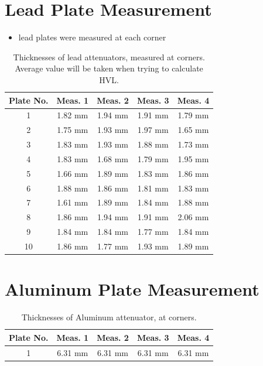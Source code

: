 \documentclass[a4paper]{article}
\begin{document}
\section{Lead Plate Measurement}
\begin{itemize}
    \item lead plates were measured at each corner
\end{itemize}
\begin{table}[H]
    \centering
    \caption{Thicknesses of lead attenuators, measured at corners. Average value will be taken when trying to calculate HVL.}
    \begin{tabular}{c c c c c}
        \toprule
        \textbf{Plate No.} & \textbf{Meas. 1} & \textbf{Meas. 2} & \textbf{Meas. 3} & \textbf{Meas. 4}\\
        \midrule
        1 & 1.82 mm & 1.94 mm & 1.91 mm & 1.79 mm\\
        2 & 1.75 mm & 1.93 mm & 1.97 mm & 1.65 mm\\
        3 & 1.83 mm & 1.93 mm & 1.88 mm & 1.73 mm\\
        4 & 1.83 mm & 1.68 mm & 1.79 mm & 1.95 mm\\
        5 & 1.66 mm & 1.89 mm & 1.83 mm & 1.86 mm\\
        6 & 1.88 mm & 1.86 mm & 1.81 mm & 1.83 mm\\
        7 & 1.61 mm & 1.89 mm & 1.84 mm & 1.88 mm\\
        8 & 1.86 mm & 1.94 mm & 1.91 mm & 2.06 mm\\
        9 & 1.84 mm & 1.84 mm & 1.77 mm & 1.84 mm\\
        10 & 1.86 mm & 1.77 mm & 1.93 mm & 1.89 mm\\
        \bottomrule
    \end{tabular}
\end{table}

\section{Aluminum Plate Measurement}

\begin{table}[H]
    \centering
    \caption{Thicknesses of Aluminum attenuator, at corners.}
    \begin{tabular}{c c c c c}
        \toprule
        \textbf{Plate No.} & \textbf{Meas. 1} & \textbf{Meas. 2} & \textbf{Meas. 3} & \textbf{Meas. 4}\\
        \midrule
        1 & 6.31 mm & 6.31 mm & 6.31 mm & 6.31 mm\\
        \bottomrule
    \end{tabular}
\end{table}
\end{document}
